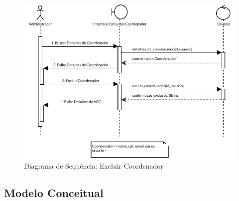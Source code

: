 \begin{figure}[H]
    \centering
    \includegraphics[width=\textwidth]{dados/figuras/Proposta/DiagramasDeSequencia/Gerenciar Coodenadores-Excluir Coordenador.pdf}
    \caption{Diagrama de Sequência: Excluir Coordenador}
    \label{diagSeq:excluirCoordenador}
\end{figure}

\subsection{Modelo Conceitual}
\label{sec:modeloConceitual}

